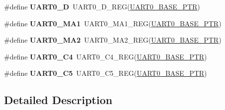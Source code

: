 \begin{DoxyCompactItemize}
\#define {\bfseries U\+A\+R\+T0\+\_\+D}~U\+A\+R\+T0\+\_\+\+D\+\_\+\+R\+EG(\hyperlink{group___u_a_r_t0___peripheral_ga50a02c91ffbd11fa7b4f0c33fe585199}{U\+A\+R\+T0\+\_\+\+B\+A\+S\+E\+\_\+\+P\+TR})
\item 
\mbox{\label{group___u_a_r_t0___register___accessor___macros_ga1ed5f65c9f9d7626053f21aa9f4a5b1f}} 
\#define {\bfseries U\+A\+R\+T0\+\_\+\+M\+A1}~U\+A\+R\+T0\+\_\+\+M\+A1\+\_\+\+R\+EG(\hyperlink{group___u_a_r_t0___peripheral_ga50a02c91ffbd11fa7b4f0c33fe585199}{U\+A\+R\+T0\+\_\+\+B\+A\+S\+E\+\_\+\+P\+TR})
\item 
\mbox{\label{group___u_a_r_t0___register___accessor___macros_gaa28e0bdbb01cd6891123e351772bcf41}} 
\#define {\bfseries U\+A\+R\+T0\+\_\+\+M\+A2}~U\+A\+R\+T0\+\_\+\+M\+A2\+\_\+\+R\+EG(\hyperlink{group___u_a_r_t0___peripheral_ga50a02c91ffbd11fa7b4f0c33fe585199}{U\+A\+R\+T0\+\_\+\+B\+A\+S\+E\+\_\+\+P\+TR})
\item 
\mbox{\label{group___u_a_r_t0___register___accessor___macros_ga872dbf2a778697ea6e01a2d8a8b08869}} 
\#define {\bfseries U\+A\+R\+T0\+\_\+\+C4}~U\+A\+R\+T0\+\_\+\+C4\+\_\+\+R\+EG(\hyperlink{group___u_a_r_t0___peripheral_ga50a02c91ffbd11fa7b4f0c33fe585199}{U\+A\+R\+T0\+\_\+\+B\+A\+S\+E\+\_\+\+P\+TR})
\item 
\mbox{\label{group___u_a_r_t0___register___accessor___macros_ga68f548f83ee16efb6cdd0cd5c37ebed3}} 
\#define {\bfseries U\+A\+R\+T0\+\_\+\+C5}~U\+A\+R\+T0\+\_\+\+C5\+\_\+\+R\+EG(\hyperlink{group___u_a_r_t0___peripheral_ga50a02c91ffbd11fa7b4f0c33fe585199}{U\+A\+R\+T0\+\_\+\+B\+A\+S\+E\+\_\+\+P\+TR})
\end{DoxyCompactItemize}


\subsection{Detailed Description}
